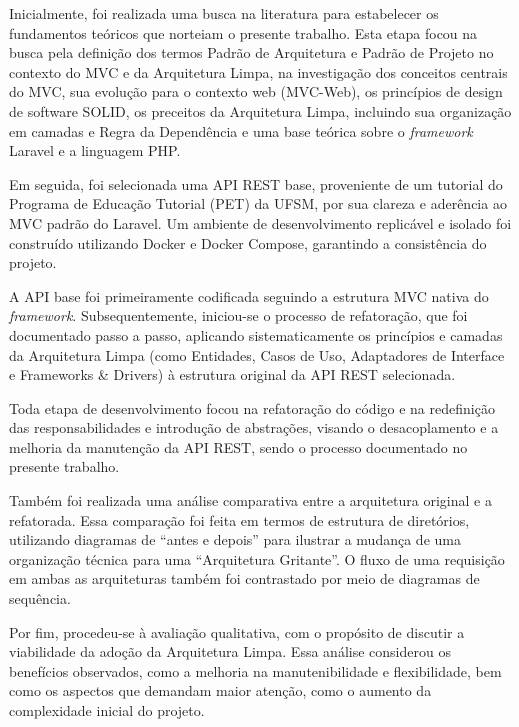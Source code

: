         \par Inicialmente, foi realizada uma busca na literatura para estabelecer os fundamentos teóricos que norteiam o presente trabalho. Esta etapa focou na busca pela definição dos termos Padrão de Arquitetura e Padrão de Projeto no contexto do MVC e da Arquitetura Limpa, na investigação dos conceitos centrais do MVC, sua evolução para o contexto web (MVC-Web), os princípios de design de software SOLID, os preceitos da Arquitetura Limpa, incluindo sua organização em camadas e Regra da Dependência e uma base teórica sobre o \textit{framework} Laravel e a linguagem PHP.

        \par Em seguida, foi selecionada uma API REST base, proveniente de um tutorial do Programa de Educação Tutorial (PET) da UFSM, por sua clareza e aderência ao MVC padrão do Laravel. Um ambiente de desenvolvimento replicável e isolado foi construído utilizando Docker e Docker Compose, garantindo a consistência do projeto.

        \par A API base foi primeiramente codificada seguindo a estrutura MVC nativa do \textit{framework}. Subsequentemente, iniciou-se o processo de refatoração, que foi documentado passo a passo, aplicando sistematicamente os princípios e camadas da Arquitetura Limpa (como Entidades, Casos de Uso, Adaptadores de Interface e Frameworks \& Drivers) à estrutura original da API REST selecionada. 
        
        \par Toda etapa de desenvolvimento focou na refatoração do código e na redefinição das responsabilidades e introdução de abstrações, visando o desacoplamento e a melhoria da manutenção da API REST, sendo o processo documentado no presente trabalho.

        \par Também foi realizada uma análise comparativa entre a arquitetura original e a refatorada. Essa comparação foi feita em termos de estrutura de diretórios, utilizando diagramas de ``antes e depois'' para ilustrar a mudança de uma organização técnica para uma ``Arquitetura Gritante''. O fluxo de uma requisição em ambas as arquiteturas também foi contrastado por meio de diagramas de sequência.

        \par Por fim, procedeu-se à avaliação qualitativa, com o propósito de discutir a viabilidade da adoção da Arquitetura Limpa. Essa análise considerou os benefícios observados, como a melhoria na manutenibilidade e flexibilidade, bem como os aspectos que demandam maior atenção, como o aumento da complexidade inicial do projeto.
        
